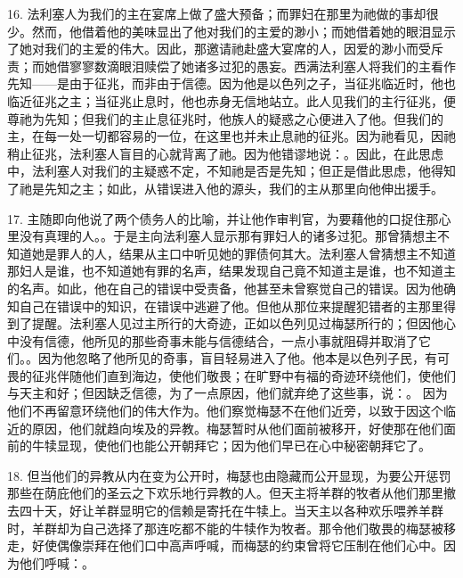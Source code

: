 16. 法利塞人为我们的主在宴席上做了盛大预备；而罪妇在那里为祂做的事却很少。然而，他借着他的美味显出了他对我们的主爱的渺小；而她借着她的眼泪显示了她对我们的主爱的伟大。因此，那邀请祂赴盛大宴席的人，因爱的渺小而受斥责；而她借寥寥数滴眼泪赎偿了她诸多过犯的愚妄。西满法利塞人将我们的主看作先知——是由于征兆，而非由于信德。因为他是以色列之子，当征兆临近时，他也临近征兆之主；当征兆止息时，他也赤身无信地站立。此人见我们的主行征兆，便尊祂为先知；但我们的主止息征兆时，他族人的疑惑之心便进入了他。但我们的主，在每一处一切都容易的一位，在这里也并未止息祂的征兆。因为祂看见，因祂稍止征兆，法利塞人盲目的心就背离了祂。因为他错谬地说：。因此，在此思虑中，法利塞人对我们的主疑惑不定，不知祂是否是先知；但正是借此思虑，他得知了祂是先知之主；如此，从错误进入他的源头，我们的主从那里向他伸出援手。\par

17. 主随即向他说了两个债务人的比喻，并让他作审判官，为要藉他的口捉住那心里没有真理的人。。于是主向法利塞人显示那有罪妇人的诸多过犯。那曾猜想主不知道她是罪人的人，结果从主口中听见她的罪债何其大。法利塞人曾猜想主不知道那妇人是谁，也不知道她有罪的名声，结果发现自己竟不知道主是谁，也不知道主的名声。如此，他在自己的错误中受责备，他甚至未曾察觉自己的错误。因为他确知自己在错误中的知识，在错误中逃避了他。但他从那位来提醒犯错者的主那里得到了提醒。法利塞人见过主所行的大奇迹，正如以色列见过梅瑟所行的；但因他心中没有信德，他所见的那些奇事未能与信德结合，一点小事就阻碍并取消了它们。。因为他忽略了他所见的奇事，盲目轻易进入了他。他本是以色列子民，有可畏的征兆伴随他们直到海边，使他们敬畏；在旷野中有福的奇迹环绕他们，使他们与天主和好；但因缺乏信德，为了一点原因，他们就弃绝了这些事，说：。 因为他们不再留意环绕他们的伟大作为。他们察觉梅瑟不在他们近旁，以致于因这个临近的原因，他们就趋向埃及的异教。梅瑟暂时从他们面前被移开，好使那在他们面前的牛犊显现，使他们也能公开朝拜它；因为他们早已在心中秘密朝拜它了。\par

18. 但当他们的异教从内在变为公开时，梅瑟也由隐藏而公开显现，为要公开惩罚那些在荫庇他们的圣云之下欢乐地行异教的人。但天主将羊群的牧者从他们那里撤去四十天，好让羊群显明它的信赖是寄托在牛犊上。当天主以各种欢乐喂养羊群时，羊群却为自己选择了那连吃都不能的牛犊作为牧者。那令他们敬畏的梅瑟被移走，好使偶像崇拜在他们口中高声呼喊，而梅瑟的约束曾将它压制在他们心中。因为他们呼喊：。\par

